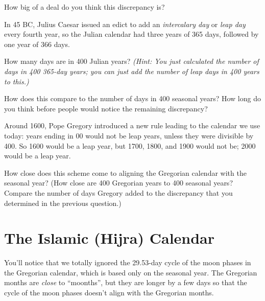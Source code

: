 \documentclass[11pt]{article}
\begin{document}
\vspace{1in}

How big of a deal do you think this discrepancy is? 

\vspace{2in}

	\underline{\hspace{6in}}
	
	\newpage

In 45 BC, Julius Caesar issued an edict to add an {\it intercalary day} or {\it leap day} every fourth year, so the Julian calendar had three years of 365 days, followed by one year of 366 days.

How many days are in 400 Julian years? {\it (Hint: You just calculated the number of days in 400 365-day years; you can just add the number of leap days in 400 years to this.)}

\vspace{1in}

\underline{\hspace{6in}}

How does this compare to the number of days in 400 seasonal years? How long do you think before people would notice the remaining discrepancy?

\vspace{1in}
\underline{\hspace{6in}}

Around 1600, Pope Gregory introduced a new rule leading to the calendar we use today: years ending in 00 would not be leap years, unless they were divisible by 400. So 1600 would be a leap year, but 1700, 1800, and 1900 would not be; 2000 would be a leap year.

How close does this scheme come to aligning the Gregorian calendar with the seasonal year? (How close are 400 Gregorian years to 400 seasonal years? Compare the number of days Gregory added to the discrepancy that you determined in the previous question.)


\vspace{1in}
\underline{\hspace{6in}}
\newpage
\section{The Islamic (Hijra) Calendar}

You'll notice that we totally ignored the 29.53-day cycle of the moon phases in the Gregorian calendar, which is based only on the seasonal year. The Gregorian months are {\it close} to ``moonths'', but they are longer by a few days so that the cycle of the moon phases doesn't align with the Gregorian months.
\end{document}
